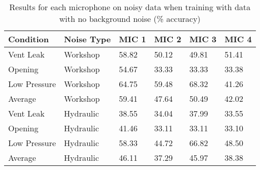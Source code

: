 \begin{table}[H]
    \centering
    \caption{Results for each microphone on noisy data when training with data with no background noise (\% accuracy)}
    \begin{tabular}{l l l l l l}
    \toprule
    Condition & Noise Type & MIC 1 & MIC 2 & MIC 3 & MIC 4 \\ \midrule
    
    Vent Leak & Workshop & 58.82 & 50.12 & 49.81 & 51.41 \\
    Opening & Workshop & 54.67 & 33.33 & 33.33 & 33.38 \\
    Low Pressure & Workshop & 64.75 & 59.48 & 68.32 & 41.26\\ \midrule
    Average & Workshop & 59.41 & 47.64 & 50.49 & 42.02 \\ \midrule
    
    Vent Leak & Hydraulic & 38.55 & 34.04 & 37.99 & 33.55 \\
    Opening & Hydraulic & 41.46 & 33.11 & 33.11 & 33.10 \\
    Low Pressure & Hydraulic & 58.33 & 44.72 & 66.82 & 48.50 \\ \midrule
    Average & Hydraulic & 46.11 & 37.29 & 45.97 & 38.38 \\ 
    
    \bottomrule
    \end{tabular}
	\label{tab:mic-nonoise}
\end{table}


    


